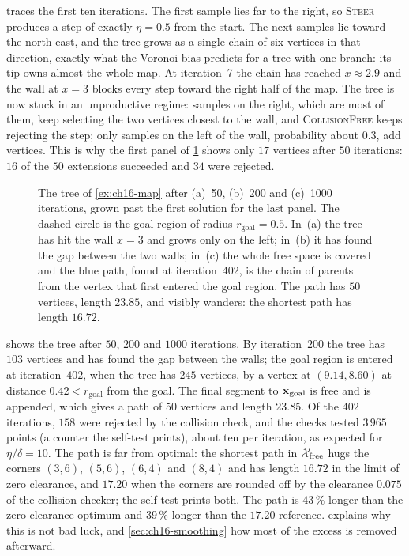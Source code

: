  traces the first ten iterations. The first sample lies
far to the right, so \textsc{Steer} produces a step of exactly $\eta=0.5$
from the start. The next samples lie toward the north-east, and the tree
grows as a single chain of six vertices in that direction, exactly what the
Voronoi bias predicts for a tree with one branch: its tip owns almost the
whole map. At iteration~7 the chain has reached $x\approx2.9$ and the wall
at $x=3$ blocks every step toward the right half of the map. The tree is now
stuck in an unproductive regime: samples on the right, which are most of
them, keep selecting the two vertices closest to the wall, and
\textsc{CollisionFree} keeps rejecting the step; only samples on the left of
the wall, probability about $0.3$, add vertices. This is why the first panel
of \cref{fig:ch16-snapshots} shows only $17$ vertices after $50$
iterations: $16$ of the $50$ extensions succeeded and $34$ were rejected.

\begin{figure}[tb]
  \centering
  \caption{The tree of \cref{ex:ch16-map} after (a)~50, (b)~200 and (c)~1000
  iterations, grown past the first solution for the last panel. The dashed
  circle is the goal region of radius $r_{\mathrm{goal}}=0.5$. In~(a) the
  tree has hit the wall $x=3$ and grows only on the left; in~(b) it has found
  the gap between the two walls; in~(c) the whole free space is covered and
  the blue path, found at iteration~402, is the chain of parents from the
  vertex that first entered the goal region. The path has $50$ vertices,
  length $23.85$, and visibly wanders: the shortest path has length $16.72$.}
  \label{fig:ch16-snapshots}
\end{figure}

 shows the tree after $50$, $200$ and $1000$
iterations. By iteration~$200$ the tree has $103$ vertices and has found the
gap between the walls; the goal region is entered at iteration~$402$, when
the tree has $245$ vertices, by a vertex at $(9.14,8.60)$ at distance
$0.42<r_{\mathrm{goal}}$ from the goal. The final segment to
$\mathbf{x}_{\mathrm{goal}}$ is free and is appended, which gives a path of $50$
vertices and length $23.85$. Of the $402$ iterations, $158$ were rejected by
the collision check, and the checks tested $3\,965$ points (a counter the self-test prints), about ten per
iteration, as expected for $\eta/\delta=10$. The path is far from optimal:
the shortest path in $\mathcal{X}_{\mathrm{free}}$ hugs the corners $(3,6)$, $(5,6)$, $(6,4)$ and
$(8,4)$ and has length $16.72$ in the limit of zero clearance, and $17.20$ when
the corners are rounded off by the clearance $0.075$ of the collision
checker; the self-test prints both. The \rrt path is $43\,\%$ longer than
the zero-clearance optimum and $39\,\%$ longer than the $17.20$ reference.  explains why this is not bad luck, and
\cref{sec:ch16-smoothing} how most of the excess is removed afterward.

